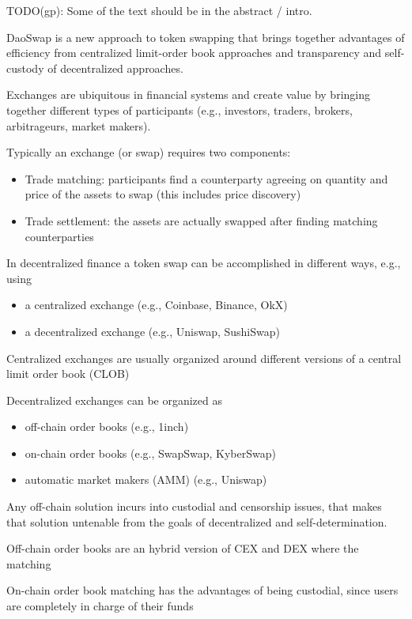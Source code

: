 \documentclass[11pt, reqno]{amsart}
\begin{document}
TODO(gp): Some of the text should be in the abstract / intro.

DaoSwap is a new approach to token swapping that brings together advantages of
efficiency from centralized limit-order book approaches and transparency and
self-custody of decentralized approaches.

Exchanges are ubiquitous in financial systems and create value by bringing
together different types of participants (e.g., investors, traders, brokers,
arbitrageurs, market makers).

Typically an exchange (or swap) requires two components:
\begin{itemize}
  \item Trade matching: participants find a counterparty agreeing on quantity and
    price of the assets to swap (this includes price discovery)
  \item Trade settlement: the assets are actually swapped after finding
    matching counterparties
\end{itemize}

In decentralized finance a token swap can be accomplished in different ways, e.g., using
\begin{itemize}
  \item a centralized exchange (e.g., Coinbase, Binance, OkX)
  \item a decentralized exchange (e.g., Uniswap, SushiSwap)
\end{itemize}

Centralized exchanges are usually organized around different versions of a
central limit order book (CLOB)

Decentralized exchanges can be organized as
\begin{itemize}
\item off-chain order books (e.g., 1inch)
\item on-chain order books (e.g., SwapSwap, KyberSwap)
\item automatic market makers (AMM) (e.g., Uniswap)
\end{itemize}

Any off-chain solution incurs into custodial and censorship issues, that makes
that solution untenable from the goals of decentralized and self-determination.

Off-chain order books are an hybrid version of CEX and DEX where the matching

On-chain order book matching has the advantages of being custodial, since users
are completely in charge of their funds
\end{document}
